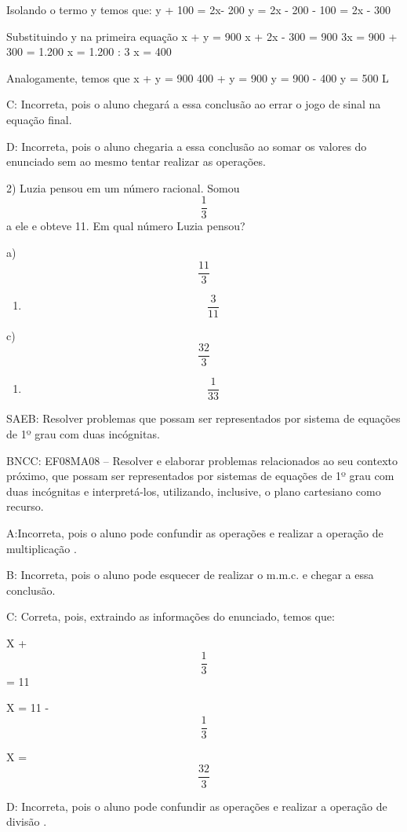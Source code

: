 Isolando o termo y temos que: y + 100 = 2x- 200 y = 2x - 200 - 100 = 2x
- 300

Substituindo y na primeira equação x + y = 900 x + 2x - 300 = 900 3x =
900 + 300 = 1.200 x = 1.200 : 3 x = 400

Analogamente, temos que x + y = 900 400 + y = 900 y = 900 - 400 y = 500
L

C: Incorreta, pois o aluno chegará a essa conclusão ao errar o jogo de
sinal na equação final.

D: Incorreta, pois o aluno chegaria a essa conclusão ao somar os valores
do enunciado sem ao mesmo tentar realizar as operações.

2) Luzia pensou em um número racional. Somou \[\frac{1}{3}\] a ele e
obteve 11. Em qual número Luzia pensou?

a) \[\frac{11}{3}\]

\begin{enumerate}
\def\labelenumi{\alph{enumi})}
\setcounter{enumi}{1}
\tightlist
\item
  \[\frac{3}{11}\]
\end{enumerate}

c) \[\frac{32}{3}\]

\begin{enumerate}
\def\labelenumi{\alph{enumi})}
\setcounter{enumi}{3}
\tightlist
\item
  \[\frac{1}{33}\]
\end{enumerate}

SAEB: Resolver problemas que possam ser representados por sistema de
equações de 1º grau com duas incógnitas.

BNCC: EF08MA08 -- Resolver e elaborar problemas relacionados ao seu
contexto próximo, que possam ser representados por sistemas de equações
de 1º grau com duas incógnitas e interpretá-los, utilizando, inclusive,
o plano cartesiano como recurso.

A:Incorreta, pois o aluno pode confundir as operações e realizar a
operação de multiplicação .

B: Incorreta, pois o aluno pode esquecer de realizar o m.m.c. e chegar a
essa conclusão.

C: Correta, pois, extraindo as informações do enunciado, temos que:

X + \[\frac{1}{3}\] = 11

X = 11 - \[\frac{1}{3}\]

X = \[\frac{32}{3}\]

D: Incorreta, pois o aluno pode confundir as operações e realizar a
operação de divisão .

